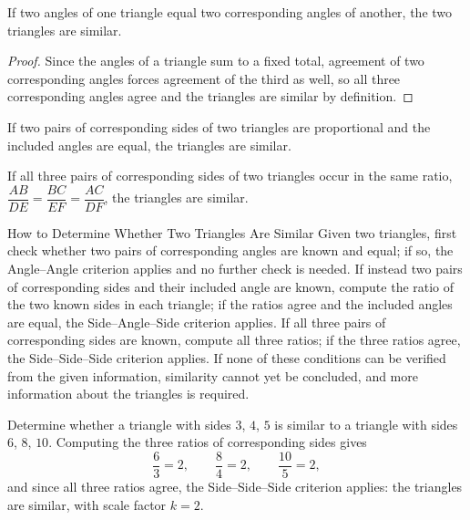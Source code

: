 \begin{theorem}
If two angles of one triangle equal two corresponding angles of another, the
two triangles are similar.
\end{theorem}
\begin{proof}
Since the angles of a triangle sum to a fixed total, agreement of two
corresponding angles forces agreement of the third as well, so all three
corresponding angles agree and the triangles are similar by definition.
\end{proof}

\begin{theorem}
If two pairs of corresponding sides of two triangles are proportional and the
included angles are equal, the triangles are similar.
\end{theorem}

\begin{theorem}
If all three pairs of corresponding sides of two triangles occur in the same
ratio, $\dfrac{AB}{DE} = \dfrac{BC}{EF} = \dfrac{AC}{DF}$, the triangles are
similar.
\end{theorem}

\begin{algorithmproc}{How to Determine Whether Two Triangles Are Similar}
Given two triangles, first check whether two pairs of corresponding angles
are known and equal; if so, the Angle--Angle criterion applies and no further
check is needed. If instead two pairs of corresponding sides and their
included angle are known, compute the ratio of the two known sides in each
triangle; if the ratios agree and the included angles are equal, the
Side--Angle--Side criterion applies. If all three pairs of corresponding
sides are known, compute all three ratios; if the three ratios agree, the
Side--Side--Side criterion applies. If none of these conditions can be
verified from the given information, similarity cannot yet be concluded, and
more information about the triangles is required.
\end{algorithmproc}

\begin{example}
Determine whether a triangle with sides $3$, $4$, $5$ is similar to a
triangle with sides $6$, $8$, $10$. Computing the three ratios of
corresponding sides gives
\[
\frac{6}{3} = 2, \qquad \frac{8}{4} = 2, \qquad \frac{10}{5} = 2,
\]
and since all three ratios agree, the Side--Side--Side criterion applies:
the triangles are similar, with scale factor $k = 2$.
\end{example}

